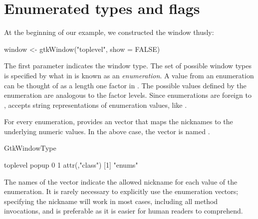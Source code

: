 
\section{Enumerated types and flags}

At the beginning of our example, we constructed the window thusly: 
\begin{Schunk}
\begin{Sinput}
 window <- gtkWindow("toplevel", show = FALSE)
\end{Sinput}
\end{Schunk}
%
The first parameter indicates the window type. The set of possible
window types is specified by what in  is known as an
\emph{enumeration}. A value from an enumeration can be thought of as a
length one factor in \R. The possible values defined by the
enumeration are analogous to the factor levels.  Since enumerations
are foreign to ,  accepts string
representations of enumeration values, like . 

For every  enumeration,  provides an 
vector that maps the nicknames to the underlying numeric values.  In
the above case, the vector is named .
\begin{Schunk}
\begin{Sinput}
 GtkWindowType
\end{Sinput}
\begin{Soutput}
toplevel    popup 
       0        1 
attr(,"class")
[1] "enums"
\end{Soutput}
\end{Schunk}
%
The names of the vector indicate the allowed nickname for each value
of the enumeration. It is rarely necessary to explicitly use the
enumeration vectors; specifying the nickname will work in most cases,
including all method invocations, and is preferable as it is easier
for human readers to comprehend.

